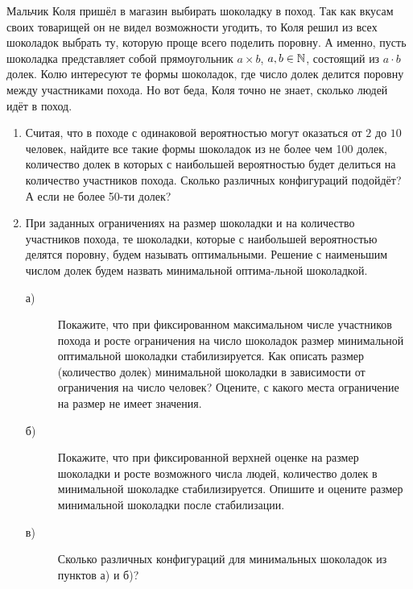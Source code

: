 
Мальчик Коля пришёл в магазин выбирать шоколадку в поход. Так как вкусам своих товарищей он не видел возможности угодить, то Коля решил из всех шоколадок выбрать ту, которую проще всего поделить поровну. А именно, пусть шоколадка представляет собой прямоугольник $a\times b$, $a, b \in \mathbb{N}$, состоящий из $a\cdot b$ долек. Колю интересуют те формы шоколадок, где число долек делится поровну между участниками похода. Но вот беда, Коля точно не знает, сколько людей идёт в поход.
\begin{enumerate}
\item Считая, что в походе с одинаковой вероятностью могут оказаться от $2$ до $10$ человек, найдите все такие формы шоколадок из не более чем 100 долек, количество долек в которых с наибольшей вероятностью будет делиться на количество участников похода. Сколько различных конфигураций подойдёт? А если не более 50-ти долек?
\item При заданных ограничениях на размер шоколадки и на количество участников похода, те шоколадки, которые с наибольшей вероятностью делятся поровну, будем называть оптимальными. Решение с наименьшим числом долек будем назвать минимальной оптима-\linebreak льной шоколадкой.
\begin{description}
\item[а)] Покажите, что при фиксированном максимальном числе участников похода и росте ограничения на число шоколадок размер минимальной оптимальной шоколадки стабилизируется. Как описать размер (количество долек) минимальной шоколадки в зависимости от ограничения на число человек? Оцените, с какого места ограничение на размер не имеет значения.
\item[б)] Покажите, что при фиксированной верхней оценке на размер шоколадки и росте возможного числа людей, количество долек в минимальной шоколадке стабилизируется. Опишите и оцените размер минимальной шоколадки после стабилизации.
\item[в)] Сколько различных конфигураций для минимальных шоколадок из пунктов а) и б)?
\end{description}


\end{enumerate}
